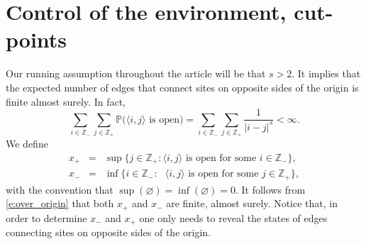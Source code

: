 \documentclass[a4paper,oneside,12pt]{amsart}
\theoremstyle{plain}
\theoremstyle{definition}
\theoremstyle{remark}
\newcommand{\Z}{{\mathbb{Z}}}
\renewcommand{\P}{\mathbb{P}}
\begin{document}
\section{Control of the environment, cut-points}
\label{s:cut_points}

Our running assumption throughout the article will be that $s>2$.
It implies that the expected number of edges that connect sites on opposite sides of the origin is finite almost surely.
In fact,
\begin{equation}
\label{e:over_origin}
\sum_{i \in \Z_-} \sum_{j \in \Z_+} \P\big( \langle i, j\rangle \text{ is open} \big)= \sum_{i \in \Z_-} \sum_{j \in \Z_+} \frac{1}{|i-j|^s} < \infty.
\end{equation}
We define
\begin{eqnarray} 
x_{+} &=& \sup\big\{ j \in \Z_+ \colon \textrm{$\langle i, j \rangle$ is open for some $i \in \Z_-$}\big\}, \\
x_{-} &=& \inf\big\{ i \in \Z_- \colon \text{ $\langle i, j \rangle$ is open for some $j \in \Z_+$}\big\},
\end{eqnarray}
with the convention that $\sup(\varnothing) = \inf(\varnothing) =0$.
It follows from \eqref{e:over_origin} that both $x_{+}$ and $x_{-}$ are finite, almost surely.
Notice that, in order to determine $x_{-}$ and $x_{+}$ one only needs to reveal the states of edges connecting sites on opposite sides of the origin.
\end{document}
